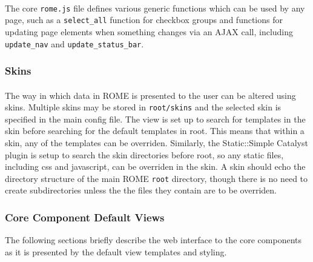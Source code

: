 \paragraph{}
The core \texttt{rome.js} file defines various generic functions which can be used by any page, such as a \texttt{select\_all} function for checkbox groups and functions for updating  page elements when something changes via an AJAX call, including \texttt{update\_nav} and \texttt{update\_status\_bar}.

\subsubsection{Skins}
\label{sec:view_skins}

\paragraph{}
The way in which data in ROME is presented to the user can be altered using skins. Multiple skins may be stored in \texttt{root/skins} and the selected skin is specified in the main config file. The view is set up to search for templates in the skin before searching for the default templates in root. This means that within a skin, any of the templates can be overriden. Similarly, the Static::Simple Catalyst plugin is setup to search the skin directories before root, so any static files, including css and javascript, can be overriden in the skin. A skin should echo the directory structure of the main ROME \texttt{root} directory, though there is no need to create subdirectories unless the the files they contain are to be overriden. 


\subsubsection{Core Component Default Views}
The following sections briefly describe the web interface to the core components as it is presented by the default view templates and styling.



